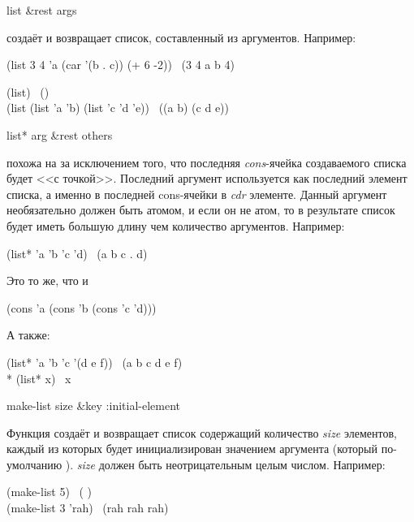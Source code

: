 \begin{defun}[Функция]
list &rest args

 создаёт и возвращает список, составленный из аргументов.
Например:
\begin{lisp}
(list 3 4 'a (car '(b . c)) (+ 6 -2)) \EV\ (3 4 a b 4)
\end{lisp}

\begin{lisp}
(list) \EV\ () \\
(list (list 'a 'b) (list 'c 'd 'e)) \EV\ ((a b) (c d e))
\end{lisp}
\end{defun}

\begin{defun}[Функция]
list* arg &rest others

 похожа на  за исключением того, что последняя
\emph{cons}-ячейка создаваемого списка будет <<с точкой>>. Последний аргумент
используется как последний элемент списка, а именно в последней cons-ячейки в
\emph{cdr} элементе. Данный аргумент необязательно должен быть атомом, и если он
не атом, то в результате список будет иметь большую длину чем количество
аргументов.
Например:
\begin{lisp}
(list* 'a 'b 'c 'd) \EV\ (a b c . d)
\end{lisp}
Это то же, что и
\begin{lisp}
(cons 'a (cons 'b (cons 'c 'd)))
\end{lisp}
А также:
\begin{lisp}
(list* 'a 'b 'c '(d e f)) \EV\ (a b c d e f) \\*
(list* x) \EQ\ x
\end{lisp}
\end{defun}

\begin{defun}[Функция]
make-list size &key :initial-element

Функция создаёт и возвращает список содержащий количество \emph{size} элементов,
каждый из которых будет инициализирован значением аргумента
 (который по-умолчанию {\false}).
\emph{size} должен быть неотрицательным целым числом.
Например:
\begin{lisp}
(make-list 5) \EV\ ({\false} {\false} {\false} {\false} {\false}) \\
(make-list 3  'rah) \EV\ (rah rah rah)
\end{lisp}
\end{defun}

